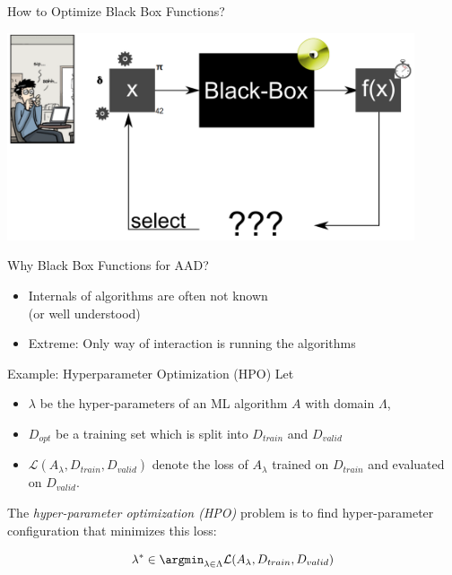 \begin{frame}[c]{How to Optimize Black Box Functions?}

\centering
\includegraphics[width=0.9\textwidth]{images/black_box_aut_opt.png}

\end{frame}
\begin{frame}[c]{Why Black Box Functions for AAD?}

\begin{itemize}
  \item Internals of algorithms are often not known\\
  (or well understood)
  \item Extreme: Only way of interaction is running the algorithms
\end{itemize}

\pause
\begin{block}{Example: Hyperparameter Optimization (HPO)}
Let 
\begin{itemize}
  \item $\lambda$ be the hyper-parameters of an ML algorithm $A$ with domain $\Lambda$,
  \item $D_{opt}$ be a training set which is split into $D_{train}$ and $D_{valid}$ 
  \item $\mathcal{L}(A_\lambda, D_{train}, D_{valid})$ denote the loss of $A_\lambda$ trained on $D_{train}$ and evaluated on $D_{valid}$.
\end{itemize}
The \emph{hyper-parameter optimization (HPO)} problem is to find hyper-parameter configuration that minimizes this loss:

\begin{equation}
\lambda^* \in \argmin_{\lambda \in \Lambda} \mathcal{L}(A_\lambda, D_{train}, D_{valid}) \nonumber  
\end{equation}

\end{block}

\end{frame}
